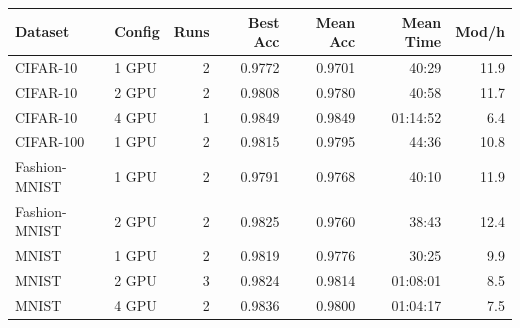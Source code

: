 \begin{tabular}{llrrrrr}
\toprule
Dataset & Config & Runs & Best Acc & Mean Acc & Mean Time & Mod/h \\
\midrule
CIFAR-10 & 1 GPU & 2 & 0.9772 & 0.9701 & 40:29 & 11.9 \\
CIFAR-10 & 2 GPU & 2 & 0.9808 & 0.9780 & 40:58 & 11.7 \\
CIFAR-10 & 4 GPU & 1 & 0.9849 & 0.9849 & 01:14:52 & 6.4 \\
CIFAR-100 & 1 GPU & 2 & 0.9815 & 0.9795 & 44:36 & 10.8 \\
Fashion-MNIST & 1 GPU & 2 & 0.9791 & 0.9768 & 40:10 & 11.9 \\
Fashion-MNIST & 2 GPU & 2 & 0.9825 & 0.9760 & 38:43 & 12.4 \\
MNIST & 1 GPU & 2 & 0.9819 & 0.9776 & 30:25 & 9.9 \\
MNIST & 2 GPU & 3 & 0.9824 & 0.9814 & 01:08:01 & 8.5 \\
MNIST & 4 GPU & 2 & 0.9836 & 0.9800 & 01:04:17 & 7.5 \\
\bottomrule
\end{tabular}